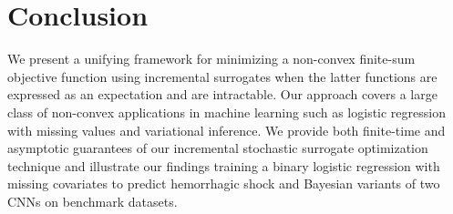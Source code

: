 \documentclass[11pt]{article}
\theoremstyle{t}
\begin{document}
\vspace{-0.05in}
\section{Conclusion}
\vspace{-0.05in}

We present a unifying framework for minimizing a non-convex finite-sum objective function using incremental surrogates when the latter functions are expressed as an expectation and are intractable.
Our approach covers a large class of non-convex applications in machine learning such as logistic regression with missing values and variational inference.
We provide both finite-time and asymptotic guarantees of our incremental stochastic surrogate optimization technique and illustrate our findings training a binary logistic regression with missing covariates to predict hemorrhagic shock and Bayesian variants of two CNNs on benchmark datasets.

\newpage




\newpage

\appendix
\end{document}
